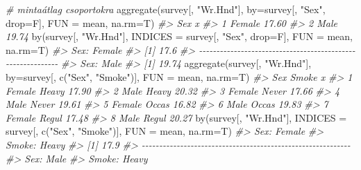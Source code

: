 \documentclass[
]{book}
\newenvironment{Shaded}{\begin{snugshade}}{\end{snugshade}}
\newcommand{\AttributeTok}[1]{\textcolor[rgb]{0.77,0.63,0.00}{#1}}
\newcommand{\CommentTok}[1]{\textcolor[rgb]{0.56,0.35,0.01}{\textit{#1}}}
\newcommand{\FunctionTok}[1]{\textcolor[rgb]{0.00,0.00,0.00}{#1}}
\newcommand{\NormalTok}[1]{#1}
\newcommand{\StringTok}[1]{\textcolor[rgb]{0.31,0.60,0.02}{#1}}
\begin{document}
\begin{Shaded}
\begin{Highlighting}[]
\CommentTok{\# mintaátlag csoportokra}
\FunctionTok{aggregate}\NormalTok{(survey[, }\StringTok{"Wr.Hnd"}\NormalTok{], }\AttributeTok{by=}\NormalTok{survey[, }\StringTok{"Sex"}\NormalTok{, }\AttributeTok{drop=}\NormalTok{F], }\AttributeTok{FUN =}\NormalTok{ mean, }\AttributeTok{na.rm=}\NormalTok{T)}
\CommentTok{\#\textgreater{}      Sex     x}
\CommentTok{\#\textgreater{} 1 Female 17.60}
\CommentTok{\#\textgreater{} 2   Male 19.74}
\FunctionTok{by}\NormalTok{(survey[, }\StringTok{"Wr.Hnd"}\NormalTok{], }\AttributeTok{INDICES =}\NormalTok{ survey[, }\StringTok{"Sex"}\NormalTok{, }\AttributeTok{drop=}\NormalTok{F], }\AttributeTok{FUN =}\NormalTok{ mean, }\AttributeTok{na.rm=}\NormalTok{T)}
\CommentTok{\#\textgreater{} Sex: Female}
\CommentTok{\#\textgreater{} [1] 17.6}
\CommentTok{\#\textgreater{} {-}{-}{-}{-}{-}{-}{-}{-}{-}{-}{-}{-}{-}{-}{-}{-}{-}{-}{-}{-}{-}{-}{-}{-}{-}{-}{-}{-}{-}{-}{-}{-}{-}{-}{-}{-}{-}{-}{-}{-}{-}{-}{-}{-}{-}{-}{-}{-}{-}{-}{-}{-}{-}{-}{-}{-}{-}{-}{-}{-} }
\CommentTok{\#\textgreater{} Sex: Male}
\CommentTok{\#\textgreater{} [1] 19.74}
\FunctionTok{aggregate}\NormalTok{(survey[, }\StringTok{"Wr.Hnd"}\NormalTok{], }\AttributeTok{by=}\NormalTok{survey[, }\FunctionTok{c}\NormalTok{(}\StringTok{"Sex"}\NormalTok{, }\StringTok{"Smoke"}\NormalTok{)], }\AttributeTok{FUN =}\NormalTok{ mean, }\AttributeTok{na.rm=}\NormalTok{T)}
\CommentTok{\#\textgreater{}      Sex Smoke     x}
\CommentTok{\#\textgreater{} 1 Female Heavy 17.90}
\CommentTok{\#\textgreater{} 2   Male Heavy 20.32}
\CommentTok{\#\textgreater{} 3 Female Never 17.66}
\CommentTok{\#\textgreater{} 4   Male Never 19.61}
\CommentTok{\#\textgreater{} 5 Female Occas 16.82}
\CommentTok{\#\textgreater{} 6   Male Occas 19.83}
\CommentTok{\#\textgreater{} 7 Female Regul 17.48}
\CommentTok{\#\textgreater{} 8   Male Regul 20.27}
\FunctionTok{by}\NormalTok{(survey[, }\StringTok{"Wr.Hnd"}\NormalTok{], }\AttributeTok{INDICES =}\NormalTok{ survey[, }\FunctionTok{c}\NormalTok{(}\StringTok{"Sex"}\NormalTok{, }\StringTok{"Smoke"}\NormalTok{)], }\AttributeTok{FUN =}\NormalTok{ mean, }\AttributeTok{na.rm=}\NormalTok{T)}
\CommentTok{\#\textgreater{} Sex: Female}
\CommentTok{\#\textgreater{} Smoke: Heavy}
\CommentTok{\#\textgreater{} [1] 17.9}
\CommentTok{\#\textgreater{} {-}{-}{-}{-}{-}{-}{-}{-}{-}{-}{-}{-}{-}{-}{-}{-}{-}{-}{-}{-}{-}{-}{-}{-}{-}{-}{-}{-}{-}{-}{-}{-}{-}{-}{-}{-}{-}{-}{-}{-}{-}{-}{-}{-}{-}{-}{-}{-}{-}{-}{-}{-}{-}{-}{-}{-}{-}{-}{-}{-} }
\CommentTok{\#\textgreater{} Sex: Male}
\CommentTok{\#\textgreater{} Smoke: Heavy}

\end{Highlighting}
\end{Shaded}
\end{document}
